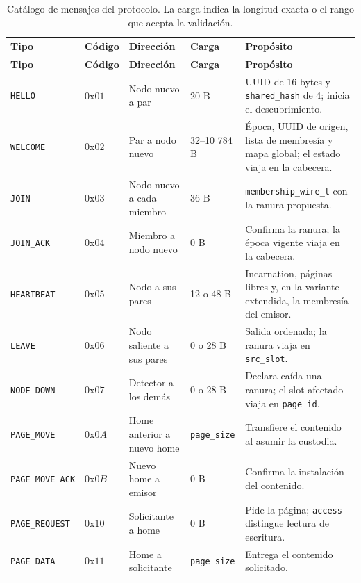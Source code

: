 {\scriptsize
\renewcommand{\arraystretch}{1.02}
\setlength{\tabcolsep}{4pt}
\begin{xltabular}{\linewidth}{l l P{3.55cm} P{1.75cm} Y}
\caption{Catálogo de mensajes del protocolo. La carga indica la longitud exacta o el rango que acepta la validación.}\label{tab:catalogo-mensajes}\\
\toprule
\textbf{Tipo} & \textbf{Código} & \textbf{Dirección} & \textbf{Carga} & \textbf{Propósito} \\
\midrule
\endfirsthead
\toprule
\textbf{Tipo} & \textbf{Código} & \textbf{Dirección} & \textbf{Carga} & \textbf{Propósito} \\
\midrule
\endhead
\texttt{HELLO} & $0\text{x}01$ & Nodo nuevo a par & 20 B & UUID de 16 bytes y \texttt{shared\_hash} de 4; inicia el descubrimiento. \\
\texttt{WELCOME} & $0\text{x}02$ & Par a nodo nuevo & 32--10 784 B & Época, UUID de origen, lista de membresía y mapa global; el estado viaja en la cabecera. \\
\texttt{JOIN} & $0\text{x}03$ & Nodo nuevo a cada miembro & 36 B & \texttt{membership\_wire\_t} con la ranura propuesta. \\
\texttt{JOIN\_ACK} & $0\text{x}04$ & Miembro a nodo nuevo & 0 B & Confirma la ranura; la época vigente viaja en la cabecera. \\
\texttt{HEARTBEAT} & $0\text{x}05$ & Nodo a sus pares & 12 o 48 B & Incarnation, páginas libres y, en la variante extendida, la membresía del emisor. \\
\texttt{LEAVE} & $0\text{x}06$ & Nodo saliente a sus pares & 0 o 28 B & Salida ordenada; la ranura viaja en \texttt{src\_slot}. \\
\texttt{NODE\_DOWN} & $0\text{x}07$ & Detector a los demás & 0 o 28 B & Declara caída una ranura; el slot afectado viaja en \texttt{page\_id}. \\
\texttt{PAGE\_MOVE} & $0\text{x}0A$ & Home anterior a nuevo home & \texttt{page\_size} & Transfiere el contenido al asumir la custodia. \\
\texttt{PAGE\_MOVE\_ACK} & $0\text{x}0B$ & Nuevo home a emisor & 0 B & Confirma la instalación del contenido. \\
\texttt{PAGE\_REQUEST} & $0\text{x}10$ & Solicitante a home & 0 B & Pide la página; \texttt{access} distingue lectura de escritura. \\
\texttt{PAGE\_DATA} & $0\text{x}11$ & Home a solicitante & \texttt{page\_size} & Entrega el contenido solicitado. \\

\end{xltabular}}
